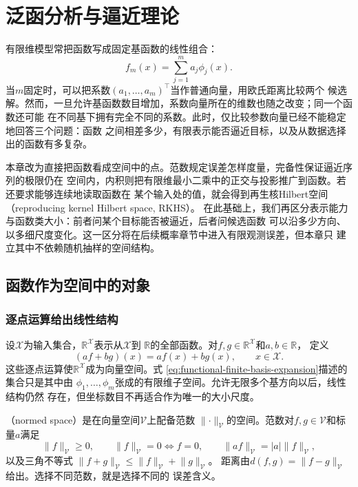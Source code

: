 \chapter{泛函分析与逼近理论}
\label{chap:functional-analysis-and-approximation}

有限维模型常把函数写成固定基函数的线性组合：
\begin{equation}
  f_m(x)=\sum_{j=1}^{m}a_j\phi_j(x).
  \label{eq:functional-finite-basis-expansion}
\end{equation}
当$m$固定时，可以把系数$(a_1,\ldots,a_m)^{\top}$当作普通向量，用欧氏距离比较两个
候选解。然而，一旦允许基函数数目增加，系数向量所在的维数也随之改变；同一个函数还可能
在不同基下拥有完全不同的系数。此时，仅比较参数向量已经不能稳定地回答三个问题：函数
之间相差多少，有限表示能否逼近目标，以及从数据选择出的函数有多复杂。

本章改为直接把函数看成空间中的点。范数规定误差怎样度量，完备性保证逼近序列的极限仍在
空间内，内积则把有限维最小二乘中的正交与投影推广到函数。若还要求能够连续地读取函数在
某个输入处的值，就会得到再生核Hilbert空间（reproducing kernel Hilbert space, RKHS）。
在此基础上，我们再区分表示能力与函数类大小：前者问某个目标能否被逼近，后者问候选函数
可以沿多少方向、以多细尺度变化。这一区分将在后续概率章节中进入有限观测误差，但本章只
建立其中不依赖随机抽样的空间结构。

\section{函数作为空间中的对象}
\label{sec:functional-functions-as-space-elements}

\subsection{逐点运算给出线性结构}

设$\mathcal{X}$为输入集合，$\mathbb{R}^{\mathcal{X}}$表示从$\mathcal{X}$到
$\mathbb{R}$的全部函数。对$f,g\in\mathbb{R}^{\mathcal{X}}$和$a,b\in\mathbb{R}$，
定义
\[
  (af+bg)(x)=af(x)+bg(x),\qquad x\in\mathcal{X}.
\]
这些逐点运算使$\mathbb{R}^{\mathcal{X}}$成为向量空间。式
\eqref{eq:functional-finite-basis-expansion}描述的集合只是其中由
$\phi_1,\ldots,\phi_m$张成的有限维子空间。允许无限多个基方向以后，线性结构仍然
存在，但坐标数目不再适合作为唯一的大小尺度。

（normed space）是在向量空间$\mathcal{V}$上配备范数
$\lVert\cdot\rVert_{\mathcal{V}}$的空间。范数对$f,g\in\mathcal{V}$和标量$a$满足
\[
  \lVert f\rVert_{\mathcal{V}}\geq0,\qquad
  \lVert f\rVert_{\mathcal{V}}=0\Longleftrightarrow f=0,\qquad
  \lVert af\rVert_{\mathcal{V}}=|a|\lVert f\rVert_{\mathcal{V}},
\]
以及三角不等式
$\lVert f+g\rVert_{\mathcal{V}}\leq
\lVert f\rVert_{\mathcal{V}}+\lVert g\rVert_{\mathcal{V}}$。
距离由$d(f,g)=\lVert f-g\rVert_{\mathcal{V}}$给出。选择不同范数，就是选择不同的
误差含义。

